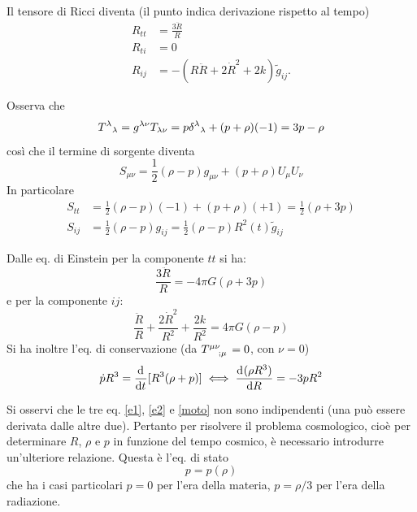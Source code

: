 Il tensore di Ricci diventa (il punto indica derivazione rispetto al tempo)
\begin{subequations}
  \begin{align}
    R_{tt} &= \frac{ 3 \ddot{R}}{R} \\
    R_{ti} &= 0 \\
    R_{ij} &= -(R\ddot{R}+2\dot{R}^2+2k) \tilde{g}_{ij}.
  \end{align}
\end{subequations}

Osserva che
\begin{equation}
  \tensor{T}{^{\lambda}}{_{\lambda}} = g^{\lambda\nu} T_{\lambda\nu} = p
  \tensor{\delta}{^{\lambda}}_{{\lambda}} + (p+\rho) (-1) = 3p - \rho
\end{equation}
così che il termine di sorgente diventa
\begin{equation}
  S_{\mu \nu} = \frac{1}{2} (\rho-p) g_{\mu\nu}+(p+\rho)U_{\mu} U_{\nu}
\end{equation}
In particolare
\begin{subequations}
  \begin{align}
    S_{tt} &= \frac{1}{2} (\rho-p)(-1)+(p+\rho)(+1) =
             \frac{1}{2} (\rho+3p) \\
    \label{sij}
    S_{ij} &= \frac{1}{2} (\rho-p) g_{ij}=
             \frac{1}{2} (\rho-p) R^2(t) \tilde{g}_{ij}
  \end{align}
\end{subequations}

Dalle eq. di Einstein per la componente $tt$ si ha:
\begin{equation}
  \frac{3 \ddot{R}}{R} = - 4\pi G (\rho+3p)
  \label{e1}
\end{equation}
e per la componente $ij$:
\begin{equation}
  \label{e2}
  \frac{\ddot{R}}{R} +\frac{2\dot{R}^2}{R^2}+\frac{2k}{R^2}= 4 \pi G (\rho-p)
\end{equation}
Si ha inoltre l'eq. di conservazione (da $\tensor{T}{^{\mu \nu}_{;\mu}}=0$, con $\nu =0$)
\begin{equation}
  \dot{p} R^3 = \frac{{\mathop{}\!\mathrm{d}^{}}}{\mathop{}\!\mathrm{d} {t}^{}}[R^3(\rho+p)]  \iff \frac{{\mathop{}\!\mathrm{d}^{}}(\rho R^3)}{\mathop{}\!\mathrm{d} {R}^{}} = -3pR^2
  \label{moto}
\end{equation}

Si osservi che le tre eq.  \eqref{e1}, \eqref{e2} e \eqref{moto} non sono
indipendenti (una può essere derivata dalle altre due).  Pertanto per risolvere
il problema cosmologico, cioè per determinare $R$, $\rho$ e $p$ in funzione del
tempo cosmico, è necessario introdurre un'ulteriore relazione.  Questa è
l'eq. di stato
\begin{equation}
  p=p(\rho)
  \label{stato}
\end{equation}
che ha i casi particolari $p=0$ per l'era della materia, $p=\rho/3$ per l'era
della radiazione.

